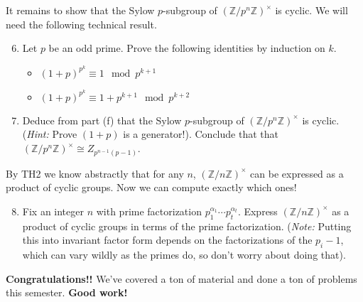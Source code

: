 \documentclass[11pt]{article}
\newcommand{\bZ}{\mathbb{Z}}
\begin{document}
\begin{enumerate}
{  It remains to show that the Sylow $p$-subgroup of $(\bZ/p^n\bZ)^\times$ is cyclic.  We will need the following technical result.
  \begin{enumerate}
    \setcounter{enumii}{5}
    \item{
    Let $p$ be an odd prime.  Prove the following identities by induction on $k$.
    \begin{itemize}
      \item{$(1+p)^{p^k}\equiv 1\mod p^{k+1}$}
      \item{$(1+p)^{p^k}\equiv1+p^{k+1}\mod p^{k+2}$}
    \end{itemize}
    }
    \item{
    Deduce from part (f) that the Sylow $p$-subgroup of $(\bZ/p^n\bZ)^\times$ is cyclic.  (\textit{Hint:} Prove $(1+p)$ is a generator!).  Conclude that that $(\bZ/p^n\bZ)^\times\cong Z_{p^{n-1}(p-1)}$.
    }
  \end{enumerate}
  By TH2 we know abstractly that for any $n$, $(\bZ/n\bZ)^\times$ can be expressed as a product of cyclic groups.  Now we can compute exactly which ones!
  \begin{enumerate}
    \setcounter{enumii}{7}
    \item{
    Fix an integer $n$ with prime factorization $p_1^{\alpha_1}\cdots p_t^{\alpha_t}$.  Express $(\bZ/n\bZ)^\times$ as a product of cyclic groups in terms of the prime factorization.  (\textit{Note:} Putting this into invariant factor form depends on the factorizations of the $p_i-1$, which can vary wildly as the primes do, so don't worry about doing that).
    }
  \end{enumerate}
  }
\end{enumerate}
\textbf{Congratulations!!}  We've covered a ton of material and done a ton of problems this semester.  \textbf{Good work!}
\end{document}
